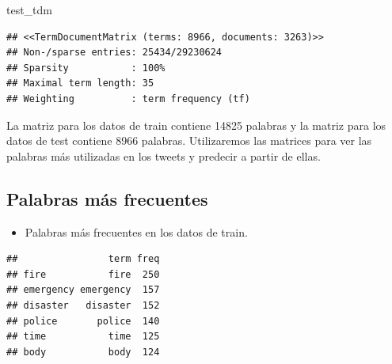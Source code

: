 \documentclass[
]{article}
\newenvironment{Shaded}{\begin{snugshade}}{\end{snugshade}}
\newcommand{\DataTypeTok}[1]{\textcolor[rgb]{0.13,0.29,0.53}{#1}}
\newcommand{\DecValTok}[1]{\textcolor[rgb]{0.00,0.00,0.81}{#1}}
\newcommand{\KeywordTok}[1]{\textcolor[rgb]{0.13,0.29,0.53}{\textbf{#1}}}
\newcommand{\NormalTok}[1]{#1}
\newcommand{\OperatorTok}[1]{\textcolor[rgb]{0.81,0.36,0.00}{\textbf{#1}}}
\newcommand{\StringTok}[1]{\textcolor[rgb]{0.31,0.60,0.02}{#1}}
\providecommand{\tightlist}{%
  \setlength{\itemsep}{0pt}\setlength{\parskip}{0pt}}
\begin{document}
\begin{Shaded}
\begin{Highlighting}[]
\NormalTok{test_tdm}
\end{Highlighting}
\end{Shaded}

\begin{verbatim}
## <<TermDocumentMatrix (terms: 8966, documents: 3263)>>
## Non-/sparse entries: 25434/29230624
## Sparsity           : 100%
## Maximal term length: 35
## Weighting          : term frequency (tf)
\end{verbatim}

La matriz para los datos de train contiene 14825 palabras y la matriz
para los datos de test contiene 8966 palabras. Utilizaremos las matrices
para ver las palabras más utilizadas en los tweets y predecir a partir
de ellas.

\hypertarget{palabras-muxe1s-frecuentes}{%
\subsection{Palabras más frecuentes}\label{palabras-muxe1s-frecuentes}}

\begin{itemize}
\tightlist
\item
  Palabras más frecuentes en los datos de train.
\end{itemize}

\begin{Shaded}
\end{Shaded}

\begin{verbatim}
##                term freq
## fire           fire  250
## emergency emergency  157
## disaster   disaster  152
## police       police  140
## time           time  125
## body           body  124
\end{verbatim}
\end{document}
